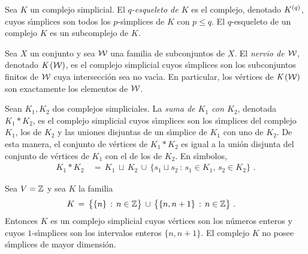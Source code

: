 \begin{ejemploQEsqueleto}%
	\label{ejemplo:qesqueleto}
	Sea $K$ un complejo simplicial. El \emph{$q$-esqueleto de $K$}
	es el complejo, denotado $\qesq{q}{K}$, cuyos s\'{\i}mplices son todos
	los $p$-s\'{\i}mplices de $K$ con $p\leq q$. El $q$-esqueleto de
	un complejo $K$ es un subcomplejo de $K$.
\end{ejemploQEsqueleto}

\begin{ejemploNervioDeUnaFamilia}%
	\label{ejemplo:nerviodeunafamilia}
	Sea $X$ un conjunto y sea $\cal{W}$ una familia de subconjuntos
	de $X$. El \emph{nervio de $\cal{W}$}, denotado $\nerv{\cal{W}}$,
	es el complejo simplicial cuyos s\'{\i}mplices son los subconjuntos
	finitos de $\cal{W}$ cuya intersecci\'{o}n sea no vac\'{\i}a.
	En particular, los v\'{e}rtices de $\nerv{\cal{W}}$ son exactamente
	los elementos de $\cal{W}$.
\end{ejemploNervioDeUnaFamilia}

\begin{ejemploSumaDeComplejos}%
	\label{ejemplo:sumadecomplejos}
	Sean $K_{1},K_{2}$ dos complejos simpliciales. La \emph{suma de %
	$K_{1}$ con $K_{2}$}, denotada $K_{1}*K_{2}$, es el complejo
	simplicial cuyos s\'{\i}mplices son los s\'{\i}mplices del
	complejo $K_{1}$, los de $K_{2}$ y las uniones disjuntas de
	un s\'{\i}mplice de $K_{1}$ con uno de $K_{2}$. De esta manera,
	el conjunto de v\'{e}rtices de $K_{1}*K_{2}$ es igual a la uni\'{o}n
	disjunta del conjunto de v\'{e}rtices de $K_{1}$ con el de los de
	$K_{2}$. En s\'{\i}mbolos,
	\begin{align*}
		K_{1}*K_{2} & \,=\,K_{1}\,\sqcup\,K_{2}\,\cup\,
			\big\{s_{1}\sqcup s_{2}\,:\,s_{1}\in K_{1},\,
						s_{2}\in K_{2}\big\}
		\text{ .}
	\end{align*}
\end{ejemploSumaDeComplejos}

\begin{ejemploSegmentosEnteros}%
	\label{ejemplo:segmentosenteros}
	Sea $V=\bb{Z}$ y sea $K$ la familia
	\begin{align*}
		K & \,=\,\big\{\{n\}\,:\,n\in\bb{Z}\big\}\,\cup\,
			\big\{\{n,n+1\}\,:\,n\in\bb{Z}\big\}
		\text{ .}
	\end{align*}
	Entonces $K$ es un complejo simplicial cuyos v\'{e}rtices son
	los n\'{u}meros enteros y cuyos $1$-s\'{\i}mplices son los
	intervalos enteros $\{n,n+1\}$. El complejo $K$ no posee
	s\'{\i}mplices de mayor dimensi\'{o}n.
\end{ejemploSegmentosEnteros}

